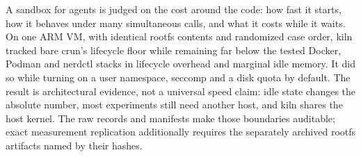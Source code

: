 \documentclass[10pt,letterpaper]{article}
\begin{document}
A sandbox for agents is judged on the cost around the code: how fast it starts,
how it behaves under many simultaneous calls, and what it costs while it waits.
On one ARM VM, with identical rootfs contents and randomized case order, kiln
tracked bare crun's lifecycle floor while remaining far below the tested Docker,
Podman and nerdctl stacks in lifecycle overhead and marginal idle memory. It did
so while turning on a user namespace, seccomp and a disk quota by default. The
result is architectural evidence, not a universal speed claim: idle state
changes the absolute number, most experiments still need another host, and kiln
shares the host kernel. The raw records and manifests make those boundaries
auditable; exact measurement replication additionally requires the separately
archived rootfs artifacts named by their hashes.
\end{document}
